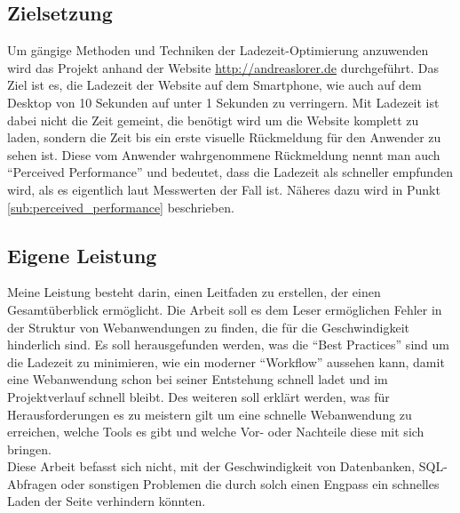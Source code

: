 	\subsection{Zielsetzung} %
	\label{sub:zielsetzung}
		Um gängige Methoden und Techniken der Ladezeit-Optimierung anzuwenden wird das Projekt anhand der Website \url{http://andreaslorer.de} durchgeführt. Das Ziel ist es, die Ladezeit der Website auf dem Smartphone, wie auch auf dem Desktop von 10 Sekunden auf unter 1 Sekunden zu verringern. Mit Ladezeit ist dabei nicht die Zeit gemeint, die benötigt wird um die Website komplett zu laden, sondern die Zeit bis ein erste visuelle Rückmeldung für den Anwender zu sehen ist. Diese vom Anwender wahrgenommene Rückmeldung nennt man auch "`Perceived Performance"' und bedeutet, dass die Ladezeit als schneller empfunden wird, als es eigentlich laut Messwerten der Fall ist. Näheres dazu wird in Punkt \ref{sub:perceived_performance} beschrieben.\\


	\subsection{Eigene Leistung} %
	\label{sub:eigene_leistung}

		Meine Leistung besteht darin, einen Leitfaden zu erstellen, der einen Gesamtüberblick ermöglicht. Die Arbeit soll es dem Leser ermöglichen Fehler in der Struktur von Webanwendungen zu finden, die für die Geschwindigkeit hinderlich sind.
		Es soll herausgefunden werden, was die "`Best Practices"' sind um die Ladezeit zu minimieren, wie ein moderner "`Workflow"' aussehen kann, damit eine Webanwendung schon bei seiner Entstehung schnell ladet und im Projektverlauf schnell bleibt. Des weiteren soll erklärt werden, was für Herausforderungen es zu meistern gilt um eine schnelle Webanwendung zu erreichen, welche Tools es gibt und welche Vor- oder Nachteile diese mit sich bringen.\\
		Diese Arbeit befasst sich nicht, mit der Geschwindigkeit von Datenbanken, SQL-Abfragen oder sonstigen Problemen die durch solch einen Engpass ein schnelles Laden der Seite verhindern könnten.


